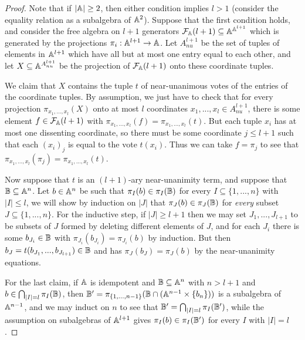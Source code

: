 \documentclass[letterpaper,11pt]{article}
\begin{document}
\begin{proof} Note that if $|\mathbb{A}| \ge 2$, then either condition implies $l > 1$ (consider the equality relation as a subalgebra of $\mathbb{A}^2$). Suppose that the first condition holds, and consider the free algebra on $l+1$ generators $\mathcal{F}_{\mathbb{A}}(l+1) \subseteq \mathbb{A}^{\mathbb{A}^{l+1}}$ which is generated by the projections $\pi_i : \mathbb{A}^{l+1} \rightarrow \mathbb{A}$. Let $A^{l+1}_{nu}$ be the set of tuples of elements in $\mathbb{A}^{l+1}$ which have all but at most one entry equal to each other, and let $X \subseteq \mathbb{A}^{A^{l+1}_{nu}}$ be the projection of $\mathcal{F}_{\mathbb{A}}(l+1)$ onto these coordinate tuples.

We claim that $X$ contains the tuple $t$ of near-unanimous votes of the entries of the coordinate tuples. By assumption, we just have to check that for every projection $\pi_{x_1, ..., x_l}(X)$ onto at most $l$ coordinates $x_1, ..., x_l \in A^{l+1}_{nu}$, there is some element $f \in \mathcal{F}_{\mathbb{A}}(l+1)$ with $\pi_{x_1, ..., x_l}(f) = \pi_{x_1, ..., x_l}(t)$. But each tuple $x_i$ has at most one dissenting coordinate, so there must be some coordinate $j \le l+1$ such that each $(x_i)_j$ is equal to the vote $t(x_i)$. Thus we can take $f = \pi_j$ to see that $\pi_{x_1, ..., x_l}(\pi_j) = \pi_{x_1, ..., x_l}(t)$.

Now suppose that $t$ is an $(l+1)$-ary near-unanimity term, and suppose that $\mathbb{B} \subseteq \mathbb{A}^n$. Let $b \in \mathbb{A}^n$ be such that $\pi_I(b) \in \pi_I(\mathbb{B})$ for every $I \subseteq \{1, ..., n\}$ with $|I| \le l$, we will show by induction on $|J|$ that $\pi_J(b) \in \pi_J(\mathbb{B})$ for \emph{every} subset $J \subseteq \{1, ..., n\}$. For the inductive step, if $|J| \ge l+1$ then we may set $J_1, ..., J_{l+1}$ to be subsets of $J$ formed by deleting different elements of $J$, and for each $J_i$ there is some $b_{J_i} \in \mathbb{B}$ with $\pi_{J_i}(b_{J_i}) = \pi_{J_i}(b)$ by induction. But then $b_J = t(b_{J_1}, ..., b_{J_{l+1}}) \in \mathbb{B}$ and has $\pi_J(b_J) = \pi_J(b)$ by the near-unanimity equations.

For the last claim, if $\mathbb{A}$ is idempotent and $\mathbb{B} \subseteq \mathbb{A}^n$ with $n > l+1$ and $b \in \bigcap_{|I| = l} \pi_I(\mathbb{B})$, then $\mathbb{B}' = \pi_{\{1, ..., n-1\}}(\mathbb{B} \cap (\mathbb{A}^{n-1}\times \{b_n\}))$ is a subalgebra of $\mathbb{A}^{n-1}$, and we may induct on $n$ to see that $\mathbb{B}' = \bigcap_{|I| = l} \pi_I(\mathbb{B}')$, while the assumption on subalgebras of $\mathbb{A}^{l+1}$ gives $\pi_I(b) \in \pi_I(\mathbb{B}')$ for every $I$ with $|I| = l$.
\end{proof}
\end{document}
